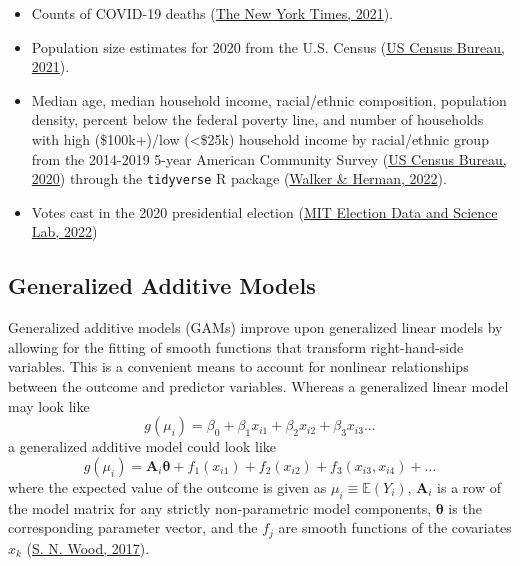 \documentclass[
]{article}
\providecommand{\tightlist}{%
  \setlength{\itemsep}{0pt}\setlength{\parskip}{0pt}}
\begin{document}
\begin{itemize}
\tightlist
\item
  Counts of COVID-19 deaths (\protect\hyperlink{ref-the_new_york_times_coronavirus_2021}{The New York Times, 2021}).
\item
  Population size estimates for 2020 from the U.S. Census (\protect\hyperlink{ref-us_census_bureau_2020_2021}{US Census Bureau, 2021}).
\item
  Median age, median household income, racial/ethnic composition, population
  density, percent below the federal poverty line, and number of households with
  high (\$100k+)/low (\textless\$25k) household income by racial/ethnic group from the
  2014-2019 5-year American Community Survey (\protect\hyperlink{ref-us_census_bureau_american_2020}{US Census Bureau, 2020})
  through the \texttt{tidyverse} R package (\protect\hyperlink{ref-walker_tidycensus_2022}{Walker \& Herman, 2022}).
\item
  Votes cast in the 2020 presidential election (\protect\hyperlink{ref-mit_election_data_and_science_lab_county_2022}{MIT Election Data and Science Lab, 2022})
\end{itemize}

\hypertarget{generalized-additive-models}{%
\subsection{Generalized Additive Models}\label{generalized-additive-models}}

Generalized additive models (GAMs) improve upon generalized linear models by
allowing for the fitting of smooth functions that transform right-hand-side variables.
This is a convenient means to account for nonlinear relationships between the
outcome and predictor variables. Whereas a generalized linear model may look like
\[ g(\mu_i) = \beta_0 + \beta_1 x_{i1} + \beta_2 x_{i2} + \beta_3 x_{i3} ...\]
a generalized additive model could look like
\[ g(\mu_i) = \mathbf A_i \mathbf \theta + f_1(x_{i1}) + f_2(x_{i2}) + f_3(x_{i3}, x_{i4}) + \dots\]
where the expected value of the outcome is given as \(\mu_i \equiv \mathbb E(Y_i)\),
\(\mathbf A_i\) is a row of the model matrix
for any strictly non-parametric model components, \(\mathbf \theta\) is the corresponding
parameter vector, and the \(f_j\) are smooth functions of the covariates \(x_k\) (\protect\hyperlink{ref-wood_generalized_2017}{S. N. Wood, 2017}).
\end{document}
